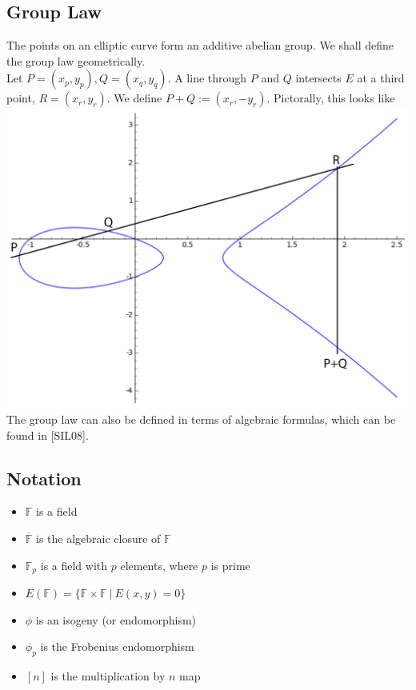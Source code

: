 \documentclass[12pt,twoside]{article}
\newcommand\given[1][]{\:#1\vert\:}
\begin{document}
\subsection{Group Law} 
The points on an elliptic curve form an additive abelian group. We shall define the group law geometrically. \\
Let $P = (x_p, y_p), Q = (x_q, y_q)$. A line through $P$ and $Q$ intersects $E$ at a third point, $R = (x_r,y_r)$. We define $P + Q := (x_r,-y_r)$. Pictorally, this looks like \\
\includegraphics[width=6in]{grouplaw.png}
The group law can also be defined in terms of algebraic formulas, which can be found in [SIL08]. %

\subsection{Notation}
\begin{itemize}
\item $\mathbb F$ is a field
\item $\overline{\mathbb F}$ is the algebraic closure of $\mathbb F$
\item $\mathbb F_p$ is a field with $p$ elements, where $p$ is prime
\item $E(\mathbb F) = \{\mathbb F \times \mathbb F \given E(x,y) = 0\}$
\item $\phi$ is an isogeny (or endomorphism)
\item $\phi_p$ is the Frobenius endomorphism
\item $[n]$ is the multiplication by $n$ map
\end{itemize}
\end{document}
